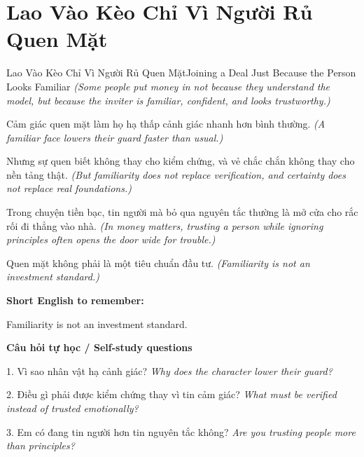 \section{Lao Vào Kèo Chỉ Vì Người Rủ Quen Mặt}
\begin{truyen}{Lao Vào Kèo Chỉ Vì Người Rủ Quen Mặt}{Joining a Deal Just Because the Person Looks Familiar}
\textit{(Some people put money in not because they understand the model, but because the inviter is familiar, confident, and looks trustworthy.)}

Cảm giác quen mặt làm họ hạ thấp cảnh giác nhanh hơn bình thường.
\textit{(A familiar face lowers their guard faster than usual.)}

Nhưng sự quen biết không thay cho kiểm chứng, và vẻ chắc chắn không thay cho nền tảng thật.
\textit{(But familiarity does not replace verification, and certainty does not replace real foundations.)}

Trong chuyện tiền bạc, tin người mà bỏ qua nguyên tắc thường là mở cửa cho rắc rối đi thẳng vào nhà.
\textit{(In money matters, trusting a person while ignoring principles often opens the door wide for trouble.)}

\end{truyen}

\begin{baihoc}
Quen mặt không phải là một tiêu chuẩn đầu tư.
\textit{(Familiarity is not an investment standard.)}
\end{baihoc}

\begin{ghinhoanh}
\textbf{Short English to remember:}

Familiarity is not an investment standard.

\end{ghinhoanh}

\begin{tuhocnhanh}
\textbf{Câu hỏi tự học / Self-study questions}

1. Vì sao nhân vật hạ cảnh giác? \textit{Why does the character lower their guard?}

2. Điều gì phải được kiểm chứng thay vì tin cảm giác? \textit{What must be verified instead of trusted emotionally?}

3. Em có đang tin người hơn tin nguyên tắc không? \textit{Are you trusting people more than principles?}
\end{tuhocnhanh}
\ngancach

